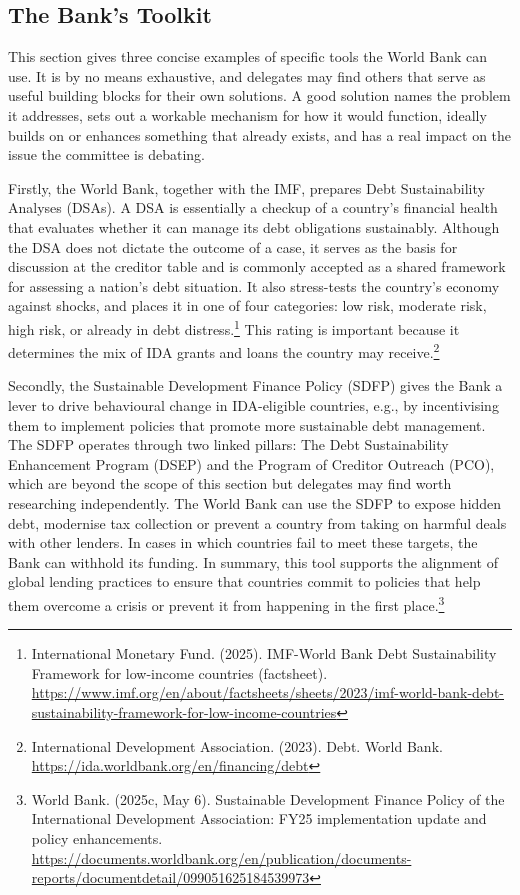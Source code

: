 \subsection{The Bank’s Toolkit}

This section gives three concise examples of specific tools the World Bank can use. It is by no means exhaustive, and delegates may find others that serve as useful building blocks for their own solutions. A good solution names the problem it addresses, sets out a workable mechanism for how it would function, ideally builds on or enhances something that already exists, and has a real impact on the issue the committee is debating.

Firstly, the World Bank, together with the IMF, prepares Debt Sustainability Analyses (DSAs). A DSA is essentially a checkup of a country’s financial health that evaluates whether it can manage its debt obligations sustainably. Although the DSA does not dictate the outcome of a case, it serves as the basis for discussion at the creditor table and is commonly accepted as a shared framework for assessing a nation’s debt situation. It also stress-tests the country’s economy against shocks, and places it in one of four categories: low risk, moderate risk, high risk, or already in debt distress.\footnote{International Monetary Fund. (2025). IMF-World Bank Debt Sustainability Framework for low-income countries (factsheet). \url{https://www.imf.org/en/about/factsheets/sheets/2023/imf-world-bank-debt-sustainability-framework-for-low-income-countries}} This rating is important because it determines the mix of IDA grants and loans the country may receive.\footnote{International Development Association. (2023). Debt. World Bank. \url{https://ida.worldbank.org/en/financing/debt}}

Secondly, the Sustainable Development Finance Policy (SDFP) gives the Bank a lever to drive behavioural change in IDA-eligible countries, e.g., by incentivising them to implement policies that promote more sustainable debt management. The SDFP operates through two linked pillars: The Debt Sustainability Enhancement Program (DSEP) and the Program of Creditor Outreach (PCO), which are beyond the scope of this section but delegates may find worth researching independently. The World Bank can use the SDFP to expose hidden debt, modernise tax collection or prevent a country from taking on harmful deals with other lenders. In cases in which countries fail to meet these targets, the Bank can withhold its funding. In summary, this tool supports the alignment of global lending practices to ensure that countries commit to policies that help them overcome a crisis or prevent it from happening in the first place.\footnote{World Bank. (2025c, May 6). Sustainable Development Finance Policy of the International Development Association: FY25 implementation update and policy enhancements. \url{https://documents.worldbank.org/en/publication/documents-reports/documentdetail/099051625184539973}}

